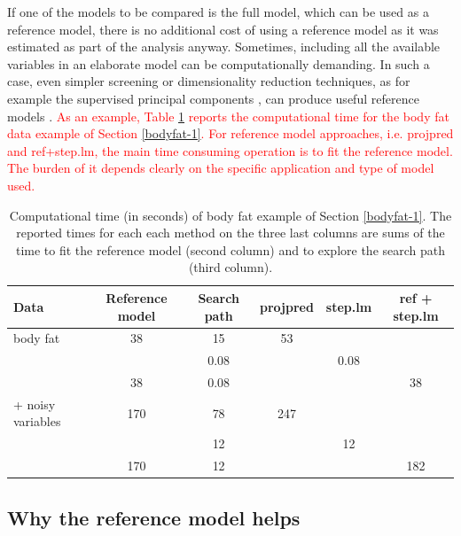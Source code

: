 \documentclass[a4]{article}
\theoremstyle{definition}
\newcommand{\fede}[1]{\textcolor{red}{#1}}
\begin{document}
If one of the models to be compared is the full model, which can be
used as a reference model, there is no additional cost of using a
reference model as it was estimated as part of the analysis anyway.
Sometimes, including all the available variables in an
elaborate model can be computationally demanding.  In such a
case, even simpler screening or dimensionality reduction techniques,
as for example the supervised principal components
\citep{bair2006prediction,piironen2018}, can produce useful reference
models \citep{paper:projpred}. \fede{As an example, Table \ref{tab:computational_time} reports
the computational time for the body fat data example of Section \ref{bodyfat-1}. 
For reference model approaches, i.e. projpred and ref+step.lm, the main
time consuming operation is to fit the reference model. The burden of it depends clearly
on the specific application and type of model used.}

\begin{table}[tp]
	\footnotesize
	\centering
	\begin{tabular}{l|cc|ccc}
		Data & Reference model & Search path & projpred & step.lm & ref + step.lm \\
		\hline
		body fat & 38 & 15 & 53 &  &  \\
		  &  & 0.08 &  & 0.08 &  \\
		  & 38 & 0.08 &  &  & 38 \\
		\hline 
		+ noisy variables & 170 & 78 & 247 &  &  \\
		  & & 12 & & 12 & \\
		  & 170 & 12 & & & 182
		
	\end{tabular}
	\caption{Computational time (in seconds) of body fat example of Section \ref{bodyfat-1}.
		The reported times for each each method on the three last columns are sums of the time to fit the reference model (second column) and
		to explore the search path (third column).}
	\label{tab:computational_time}
\end{table}


\hypertarget{reference-model-approach}{
\subsection{Why the reference model helps}\label{reference-model-approach}}
 
\end{document}
